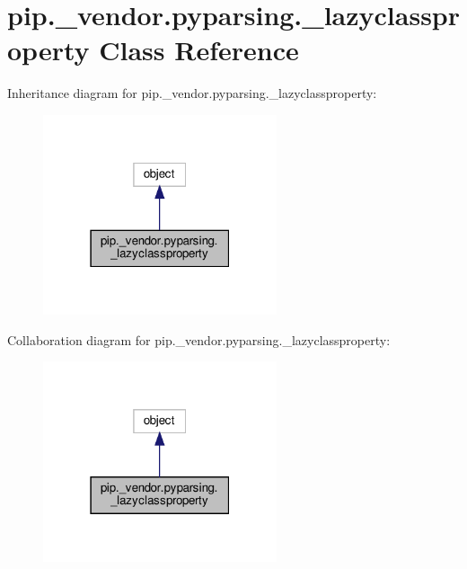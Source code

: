 \hypertarget{classpip_1_1__vendor_1_1pyparsing_1_1__lazyclassproperty}{}\section{pip.\+\_\+vendor.\+pyparsing.\+\_\+lazyclassproperty Class Reference}
\label{classpip_1_1__vendor_1_1pyparsing_1_1__lazyclassproperty}


Inheritance diagram for pip.\+\_\+vendor.\+pyparsing.\+\_\+lazyclassproperty\+:
\nopagebreak
\begin{figure}[H]
\begin{center}
\leavevmode
\includegraphics[width=195pt]{classpip_1_1__vendor_1_1pyparsing_1_1__lazyclassproperty__inherit__graph}
\end{center}
\end{figure}


Collaboration diagram for pip.\+\_\+vendor.\+pyparsing.\+\_\+lazyclassproperty\+:
\nopagebreak
\begin{figure}[H]
\begin{center}
\leavevmode
\includegraphics[width=195pt]{classpip_1_1__vendor_1_1pyparsing_1_1__lazyclassproperty__coll__graph}
\end{center}
\end{figure}
